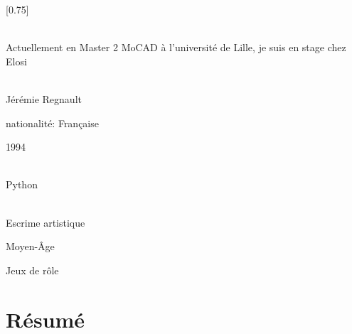 \documentclass[lighthipster]{simplehipstercv}
\begin{document}
\setlength{\columnsep}{1.5cm}
[0.75]
\begin{paracol}{2}

\paracolbackgroundoptions



\footnotesize
{\setasidefontcolour
\flushright
\begin{center}
\end{center}

\\[0.5em]

{\footnotesize
Actuellement en Master 2 MoCAD à l'université de Lille,
je suis en stage chez Elosi}
\bigskip

 \\[0.5em]
Jérémie Regnault

nationalité: Française

1994

\bigskip

 \\[0.5em]

Python

\bigskip



\bigskip

\\[0.5em]

Escrime artistique

Moyen-Âge

Jeux de rôle
\bigskip

\vspace{4em}


\phantom{turn the page}

\phantom{turn the page}
}
\switchcolumn

\small
\section*{Résumé}


\end{paracol}
\end{document}
